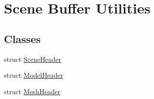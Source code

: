 \hypertarget{group__g13}{}\section{Scene Buffer Utilities}
\label{group__g13}
\subsection*{Classes}
\begin{DoxyCompactItemize}
\item 
struct \hyperlink{struct_scene_header}{Scene\+Header}
\item 
struct \hyperlink{struct_model_header}{Model\+Header}
\item 
struct \hyperlink{struct_mesh_header}{Mesh\+Header}
\end{DoxyCompactItemize}
